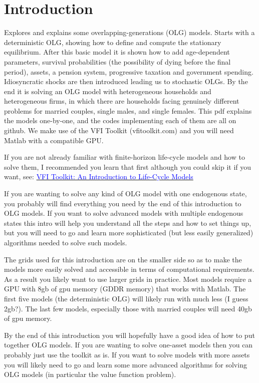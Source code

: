 \documentclass[11pt]{article}%
\begin{document}
\section{Introduction}
Explores and explains some overlapping-generations (OLG) models. Starts with a deterministic OLG, showing how to define and compute the stationary equilibrium. After this basic model it is shown how to add age-dependent parameters, survival probabilities (the possibility of dying before the final period), assets, a pension system, progressive taxation and government spending. Idiosyncratic shocks are then introduced leading us to stochastic OLGs. By the end it is solving an OLG model with heterogeneous households and heterogeneous firms, in which there are households facing genuinely different problems for married couples, single males, and single females. This pdf explains the models one-by-one, and the codes implementing each of them are all on github. We make use of the VFI Toolkit (vfitoolkit.com) and you will need Matlab with a compatible GPU.

If you are not already familiar with finite-horizon life-cycle models and how to solve them, I recommended you learn that first although you could skip it if you want, see: \href{https://www.vfitoolkit.com/updates-blog/2021/an-introduction-to-life-cycle-models/}{\textcolor{blue}{VFI Toolkit: An Introduction to Life-Cycle Models}}

If you are wanting to solve any kind of OLG model with one endogenous state, you probably will find everything you need by the end of this introduction to OLG models. If you want to solve advanced models with multiple endogenous states this intro will help you understand all the steps and how to set things up, but you will need to go and learn more sophisticated (but less easily generalized) algorithms needed to solve such models.

The grids used for this introduction are on the smaller side so as to make the models more easily solved and accessible in terms of computational requirements. As a result you likely want to use larger grids in practice. Most models require a GPU with 8gb of gpu memory (GDDR memory) that works with Matlab. The first five models (the deterministic OLG) will likely run with much less (I guess 2gb?). The last few models, especially those with married couples will need 40gb of gpu memory.

By the end of this introduction you will hopefully have a good idea of how to put together OLG models. If you are wanting to solve one-asset models then you can probably just use the toolkit as is. If you want to solve models with more assets you will likely need to go and learn some more advanced algorithms for solving OLG models (in particular the value function problem).
\end{document}
